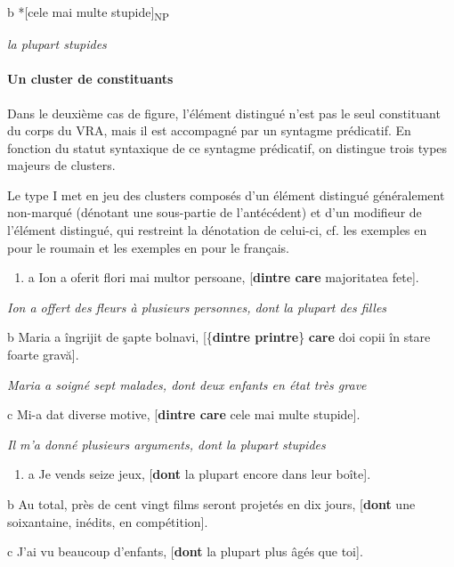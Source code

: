   b  *[cele mai multe stupide]\textsubscript{NP}

{\itshape
la plupart stupides}

\paragraph[Un cluster de constituants]{Un cluster de constituants}
Dans le deuxième cas de figure, l'élément distingué n'est pas le seul constituant du corps du VRA, mais il est accompagné par un syntagme prédicatif. En fonction du statut syntaxique de ce syntagme prédicatif, on distingue trois types majeurs de clusters.

Le type I met en jeu des clusters composés d'un élément distingué généralement non-marqué (dénotant une sous-partie de l'antécédent) et d'un modifieur de l'élément distingué, qui restreint la dénotation de celui-ci, cf. les exemples en  pour le roumain et les exemples en  pour le français. 


\begin{enumerate}
\item \label{bkm:Ref293333940}a  Ion a oferit flori mai multor persoane, [\textbf{dintre care} majoritatea fete].


\end{enumerate}
    \textit{Ion a offert des fleurs à plusieurs personnes, dont la plupart des filles}

  b  Maria a îngrijit de şapte bolnavi, [\{\textbf{dintre {\textbar} printre}\} \textbf{care} doi copii în stare foarte gravă].

    \textit{Maria a soigné sept malades, dont deux enfants en état très grave}

\textit{ } c  Mi-a dat diverse motive, [\textbf{dintre care} cele mai multe stupide].

    \textit{Il m'a donné plusieurs arguments, dont la plupart stupides}


\begin{enumerate}
\item \label{bkm:Ref293333959}a  Je vends seize jeux, [\textbf{dont} la plupart encore dans leur boîte].


\end{enumerate}
  b  Au total, près de cent vingt films seront projetés en dix jours, [\textbf{dont} une soixantaine, inédits, en compétition]. 

  c  J'ai vu beaucoup d'enfants, [\textbf{dont} la plupart plus âgés que toi].

